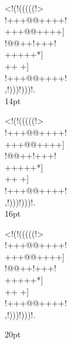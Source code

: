 \documentclass[10pt]{article}
\begin{document}
\begin{center}
\newpage
{
{
\gnos%
<!(!(((((!>\\
!+++@@++++!\\
+++@@++++]\\
!@@++!+++!\\
+++++*]\\
++
+]\\
!+++@@++++!\\
,!)))!)))!.\\
}
}
14pt

{
\gnos%
<!(!(((((!>\\
!+++@@++++!\\
+++@@++++]\\
!@@++!+++!\\
+++++*]\\
++
+]\\
!+++@@++++!\\
,!)))!)))!.\\
}
16pt

{
\gnos%
<!(!(((((!>\\
!+++@@++++!\\
+++@@++++]\\
!@@++!+++!\\
+++++*]\\
++
+]\\
!+++@@++++!\\
,!)))!)))!.\\
\par
}
20pt

\newpage


\end{center}
\end{document}
